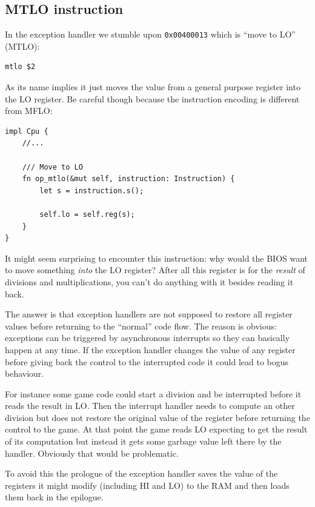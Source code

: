 \documentclass[a4paper]{article}
\newcommand{\code}[1] {\texttt{#1}}
\begin{document}
\subsection{MTLO instruction}

In the exception handler we stumble upon \code{0x00400013} which is
``move to LO'' (MTLO):

\begin{lstlisting}[language=assembly]
mtlo $2
\end{lstlisting}

As its name implies it just moves the value from a general purpose
register into the LO register. Be careful though because the
instruction encoding is different from MFLO:

\begin{lstlisting}
impl Cpu {
    //...

    /// Move to LO
    fn op_mtlo(&mut self, instruction: Instruction) {
        let s = instruction.s();

        self.lo = self.reg(s);
    }
}
\end{lstlisting}

It might seem surprising to encounter this instruction: why would the
BIOS want to move something \emph{into} the LO register? After all
this register is for the \emph{result} of divisions and
multiplications, you can't do anything with it besides reading it
back.

The answer is that exception handlers are not supposed to restore all
register values before returning to the ``normal'' code flow. The
reason is obvious: exceptions can be triggered by asynchronous
interrupts so they can basically happen at any time. If the exception
handler changes the value of any register before giving back the
control to the interrupted code it could lead to bogus behaviour.

For instance some game code could start a division and be interrupted
before it reads the result in LO. Then the interrupt handler needs to
compute an other division but does not restore the original value of
the register before returning the control to the game. At that point
the game reads LO expecting to get the result of its computation but
instead it gets some garbage value left there by the
handler. Obviously that would be problematic.

To avoid this the prologue of the exception handler saves the value of
the registers it might modify (including HI and LO) to the RAM and
then loads them back in the epilogue.
\end{document}
